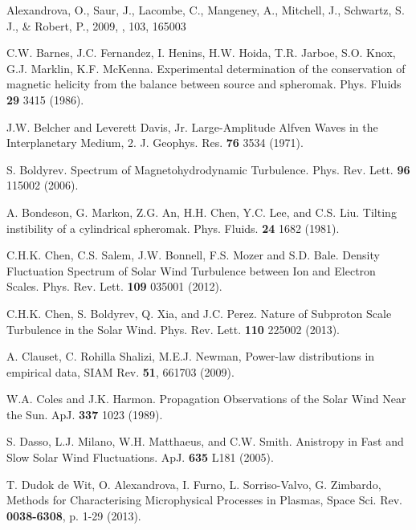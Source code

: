 \documentclass[manuscript]{aastex}
\begin{document}
\begin{thebibliography}{}

 Alexandrova, O., Saur, J., Lacombe, C., Mangeney, A., Mitchell, J., Schwartz, S. J., \& Robert, P., 2009, \prl, 103, 165003

C.W. Barnes, J.C. Fernandez, I. Henins, H.W. Hoida, T.R. Jarboe, S.O. Knox, G.J. Marklin, K.F. McKenna. Experimental determination of the conservation of magnetic helicity from the balance between source and spheromak. Phys. Fluids {\bf 29} 3415 (1986).

 J.W. Belcher and Leverett Davis, Jr. Large-Amplitude Alfven Waves in the Interplanetary Medium, 2. J. Geophys. Res. {\bf 76} 3534 (1971).

 S. Boldyrev. Spectrum of Magnetohydrodynamic Turbulence. Phys. Rev. Lett. {\bf 96} 115002 (2006).

 A. Bondeson, G. Markon, Z.G. An, H.H. Chen, Y.C. Lee, and C.S. Liu. Tilting instibility of a cylindrical spheromak. Phys. Fluids. {\bf 24} 1682 (1981).

 C.H.K. Chen, C.S. Salem, J.W. Bonnell, F.S. Mozer and S.D. Bale. Density Fluctuation Spectrum of Solar Wind Turbulence between Ion and Electron Scales. Phys. Rev. Lett. {\bf 109} 035001 (2012).

 C.H.K. Chen, S. Boldyrev, Q. Xia, and J.C. Perez. Nature of Subproton Scale Turbulence in the Solar Wind. Phys. Rev. Lett. {\bf 110} 225002 (2013).

A. Clauset, C. Rohilla Shalizi, M.E.J. Newman, Power-law distributions in empirical data, SIAM Rev. {\bf 51}, 661703 (2009).

 W.A. Coles and J.K. Harmon. Propagation Observations of the Solar Wind Near the Sun. ApJ. {\bf 337} 1023 (1989).

 S. Dasso, L.J. Milano, W.H. Matthaeus, and C.W. Smith. Anistropy in Fast and Slow Solar Wind Fluctuations. ApJ. {\bf 635} L181 (2005).

 T. Dudok de Wit, O. Alexandrova, I. Furno, L. Sorriso-Valvo, G. Zimbardo, Methods for Characterising Microphysical Processes in Plasmas, Space Sci. Rev. {\bf 0038-6308}, p. 1-29 (2013).


\end{thebibliography}
\end{document}
